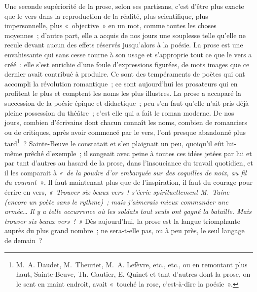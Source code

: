 \documentclass[french,twoside]{book} %
\begin{document}
Une seconde supériorité de la prose, selon ses partisans, c’est d’être plus exacte que le vers dans la reproduction de la réalité, plus scientifique, plus impersonnelle, plus « objective » en un mot, comme toutes les choses moyennes ; d’autre part, elle a acquis de nos jours une souplesse telle qu’elle ne recule devant aucun des effets réservés jusqu’alors  à la poésie. La prose est une envahissante qui sans cesse tourne à son usage et s’approprie tout ce que le vers a créé : elle s’est enrichie d’une foule d’expressions figurées, de mots images que ce dernier avait contribué à produire. Ce sont des tempéraments de poètes qui ont accompli la révolution romantique ; ce sont aujourd’hui les prosateurs qui en profitent le plus et comptent les noms les plus illustres. La prose a accaparé la succession de la poésie épique et didactique ; peu s’en faut qu’elle n’ait pris déjà pleine possession du théâtre ; c’est elle qui a fait le roman moderne. De nos jours, combien d’écrivains dont chacun connaît les noms, combien de romanciers ou de critiques, après avoir commencé par le vers, l’ont presque abandonné plus tard\footnote{M. A. Daudet, M. Theuriet, M. A. Lefèvre, etc., etc., ou en remontant plus haut, Sainte-Beuve, Th. Gautier, E. Quinet et tant d’autres dont la prose, on le sent en maint endroit, avait « touché la rose, c’est-à-dire la poésie ».} ? Sainte-Beuve le constatait et s’en plaignait un peu, quoiqu’il eût lui-même prêché d’exemple ; il songeait avec peine à toutes ces idées jetées par lui et par tant d’autres au hasard de la prose, dans l’insouciance du travail quotidien, et il les comparait à \emph{« de la poudre d’or embarquée sur des coquilles de noix, au fil du courant »}. Il faut maintenant plus que de l’inspiration, il faut du courage pour écrire en vers, \emph{« Trouver six beaux vers ! s’écrie spirituellement M. Taine (encore un poète sans le rythme) ; mais j’aimerais mieux commander une armée… Il y a telle occurrence où les soldats tout seuls ont gagné la bataille. Mais trouver six beaux vers ! »} Dès aujourd’hui, la prose est la langue  triomphante auprès du plus grand nombre ; ne sera-t-elle pas, ou à peu près, le seul langage de demain ?\par
\par
\end{document}
